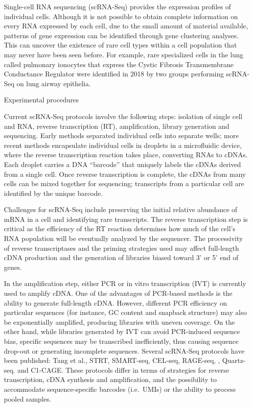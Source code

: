 Single-cell RNA sequencing (scRNA-Seq) provides the expression profiles of individual cells. Although it is not possible to obtain complete information on every RNA expressed by each cell, due to the small amount of material available, patterns of gene expression can be identified through gene clustering analyses. This can uncover the existence of rare cell types within a cell population that may never have been seen before. For example, rare specialized cells in the lung called pulmonary ionocytes that express the Cystic Fibrosis Transmembrane Conductance Regulator were identified in 2018 by two groups performing scRNA-Seq on lung airway epithelia.

Experimental procedures

Current scRNA-Seq protocols involve the following steps: isolation of single cell and RNA, reverse transcription (RT), amplification, library generation and sequencing. Early methods separated individual cells into separate wells; more recent methods encapsulate individual cells in droplets in a microfluidic device, where the reverse transcription reaction takes place, converting RNAs to cDNAs. Each droplet carries a DNA ``barcode'' that uniquely labels the cDNAs derived from a single cell. Once reverse transcription is complete, the cDNAs from many cells can be mixed together for sequencing; transcripts from a particular cell are identified by the unique barcode.

Challenges for scRNA-Seq include preserving the initial relative abundance of mRNA in a cell and identifying rare transcripts. The reverse transcription step is critical as the efficiency of the RT reaction determines how much of the cell's RNA population will be eventually analyzed by the sequencer. The processivity of reverse transcriptases and the priming strategies used may affect full-length cDNA production and the generation of libraries biased toward 3' or 5' end of genes.

In the amplification step, either PCR or in vitro transcription (IVT) is currently used to amplify cDNA. One of the advantages of PCR-based methods is the ability to generate full-length cDNA. However, different PCR efficiency on particular sequences (for instance, GC content and snapback structure) may also be exponentially amplified, producing libraries with uneven coverage. On the other hand, while libraries generated by IVT can avoid PCR-induced sequence bias, specific sequences may be transcribed inefficiently, thus causing sequence drop-out or generating incomplete sequences. Several scRNA-Seq protocols have been published: Tang et al., STRT, SMART-seq, CEL-seq, RAGE-seq, , Quartz-seq. and C1-CAGE. These protocols differ in terms of strategies for reverse transcription, cDNA synthesis and amplification, and the possibility to accommodate sequence-specific barcodes (i.e.~UMIs) or the ability to process pooled samples.

